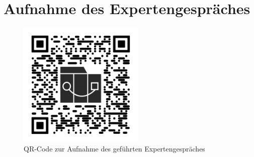 \section{Aufnahme des Expertengespräches}\label{sec:aufnahme-des-expertengespräches}
\begin{figure}[h]
    \centering
    \includegraphics[width=6cm,height=6cm]{images/appendix/qr-rec}
    \caption{QR-Code zur Aufnahme des geführten Expertengespräches}
    \label{fig:rec}
\end{figure}
